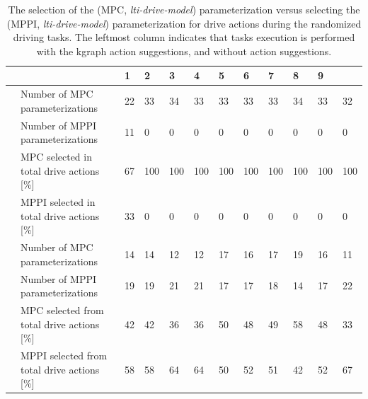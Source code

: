 \begin{table}[H]
    \caption{The selection of the (\ac{MPC}, \textit{lti-drive-model}) parameterization versus selecting the (\ac{MPPI}, \textit{lti-drive-model}) parameterization for drive actions during the randomized driving tasks. The leftmost column indicates that tasks execution is performed with the \ac{kgraph} action suggestions, and without action suggestions.}%
    \label{table:rand_drive_mpc_vs_mppi}
    \centering
    \begin{tabular}%
      {%
        >{\raggedright\arraybackslash}p{}
        >{\raggedright\arraybackslash}p{}
      |p{0.4cm}p{0.4cm}p{0.4cm}p{0.4cm}p{0.4cm}p{0.4cm}p{0.4cm}p{0.4cm}p{0.4cm}p{0.4cm}}
      \multicolumn{2}{c|}{Number of Tasks in experience} &0&1&2&3&4&5&6&7&8&9\\\toprule
      \multirow{4}{0.1\textwidth}{With \ac{kgraph} suggestions} 
      &Number of \ac{MPC} parameterizations&22&33&34&33&33&33&33&34&33&32\\
      &Number of \ac{MPPI} parameterizations&11&0&0&0&0&0&0&0&0&0\\
      & \ac{MPC} selected in total drive actions [\%]&67&100&100&100&100&100&100&100&100&100\\
      & \ac{MPPI} selected in total drive actions [\%]&33&0&0&0&0&0&0&0&0&0\\\midrule
      \multirow{4}{0.1\textwidth}{Without \ac{kgraph} suggestions} 
      &Number of \ac{MPC} parameterizations &14&14&12&12&17&16&17&19&16&11\\
      &Number of \ac{MPPI} parameterizations &19&19&21&21&17&17&18&14&17&22\\
      & \ac{MPC} selected from total drive actions [\%] &42&42&36&36&50&48&49&58&48&33\\
      & \ac{MPPI} selected from total drive actions [\%]&58&58&64&64&50&52&51&42&52&67\\
    \end{tabular}
\end{table}


